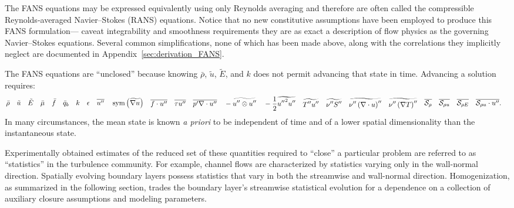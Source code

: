 The FANS equations may be expressed equivalently using only Reynolds averaging
and therefore are often called the compressible Reynolds-averaged Navier--Stokes
(RANS) equations.  Notice that no new constitutive assumptions have been
employed to produce this FANS formulation--- caveat integrability and smoothness
requirements they are as exact a description of flow physics as the governing
Navier--Stokes equations.  Several common simplifications, none of which has
been made above, along with the correlations they implicitly neglect are
documented in Appendix~\ref{sec:derivation_FANS}.

The FANS equations are ``unclosed'' because knowing $\bar{\rho}$, $\tilde{u}$,
$\tilde{E}$, and $k$ does not permit advancing that state in time.  Advancing a
solution requires:
\begin{subequations}
\begin{align*}
&\bar{\rho}
&
&\tilde{u}
&
&\tilde{E}
&
&\bar{\mu}
&
&\bar{f}
&
&\bar{q}_b
&
&k
&
&\epsilon
&
&\overline{u''}
&
&\symmetricpart{\widetilde{\nabla{}u}}
\end{align*}
\begin{align*}
&\overline{f\cdot{}u''}
&
&\overline{\tau{}u''}
&
&\overline{p'\nabla\cdot{}u''}
&
&-\widetilde{u''\otimes{}u''}
&
&-\frac{1}{2}\widetilde{{u''}^{2}u''}
\end{align*}
\begin{align*}
&\widetilde{T''u''}
&
&\widetilde{\nu''S''}
&
&\widetilde{\nu''\left(\nabla\cdot{}u\right)''}
&
&\widetilde{\nu''\left(\nabla{}T\right)''}
\end{align*}
\begin{align*}
&\overline{\Ssd_{\rho{}}}
&
&\overline{\Ssd_{\rho{} u}}
&
&\overline{\Ssd_{\rho{} E}}
&
&\overline{\Ssd_{\rho{} u}\cdot{}u''}.
\end{align*}
\end{subequations}
In many circumstances, the mean state is known \emph{a priori} to be independent
of time and of a lower spatial dimensionality than the instantaneous state.

Experimentally obtained estimates of the reduced set of these quantities
required to ``close'' a particular problem are referred to as
``statistics'' in the turbulence community.  For example, channel flows are
characterized by statistics varying only in the wall-normal direction.
Spatially evolving boundary layers possess statistics that vary in both the
streamwise and wall-normal direction.  Homogenization, as summarized in the
following section, trades the boundary layer's streamwise statistical evolution
for a dependence on a collection of auxiliary closure assumptions and modeling
parameters.


